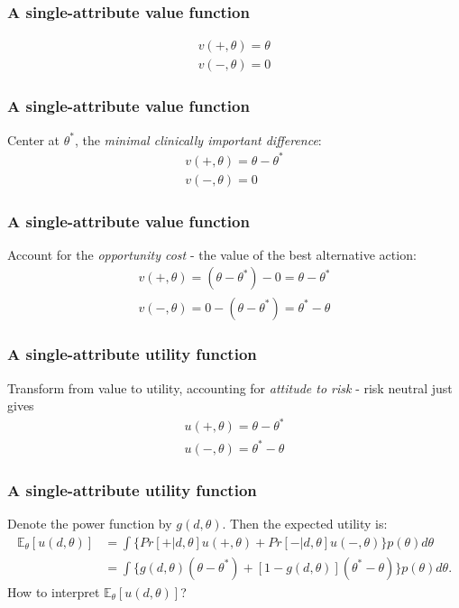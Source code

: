 \documentclass{beamer}
\begin{document}
\begin{frame}
\frametitle{A single-attribute value function}
\begin{align}
v(+, \theta) = \theta  \\
v(-, \theta) = 0
\end{align}
\end{frame}

\begin{frame}
\frametitle{A single-attribute value function}
Center at $\theta^{*}$, the \emph{minimal clinically important difference}:
\begin{align}
v(+, \theta) = \theta - \theta^{*} \\
v(-, \theta) = 0
\end{align}
\end{frame}

\begin{frame}
\frametitle{A single-attribute value function}
Account for the \emph{opportunity cost} - the value of the best alternative action:
\begin{align}
v(+, \theta) = (\theta - \theta^{*}) - 0 = \theta - \theta^{*}\\
v(-, \theta) = 0 - (\theta - \theta^{*}) =  \theta^{*} - \theta
\end{align}
\end{frame}

\begin{frame}
\frametitle{A single-attribute utility function}
Transform from value to utility, accounting for \emph{attitude to risk} - risk neutral just gives
\begin{align}
u(+, \theta) = \theta - \theta^{*}\\
u(-, \theta) =  \theta^{*} - \theta
\end{align}
\end{frame}

\begin{frame}
\frametitle{A single-attribute utility function}
Denote the power function by $g(d, \theta)$. Then the expected utility is:
\begin{align}
\mathbb{E}_{\theta}[u(d, \theta)] & = \int \{Pr[+ | d, \theta]u(+, \theta) + Pr[- | d, \theta]u(-, \theta)\}p(\theta) d\theta \\
& = \int \{g(d, \theta)(\theta - \theta^{*}) + [1- g(d, \theta)](\theta^{*} - \theta)\}p(\theta) d\theta.
\end{align}
How to interpret $\mathbb{E}_{\theta}[u(d, \theta)]$?
\end{frame}
\end{document}
